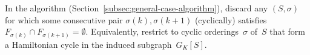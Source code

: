 \begin{corollary}\label{cor:adjacency-pruning}
In the algorithm (Section~\ref{subsec:general-case-algorithm}), discard any
$(S, \sigma)$ for which some consecutive pair
$\sigma(k), \sigma(k{+}1)$ (cyclically) satisfies
$F_{\sigma(k)} \cap F_{\sigma(k+1)} = \emptyset$.
Equivalently, restrict to cyclic orderings~$\sigma$ of~$S$ that
form a Hamiltonian cycle in the induced subgraph~$G_K[S]$.
\end{corollary}
